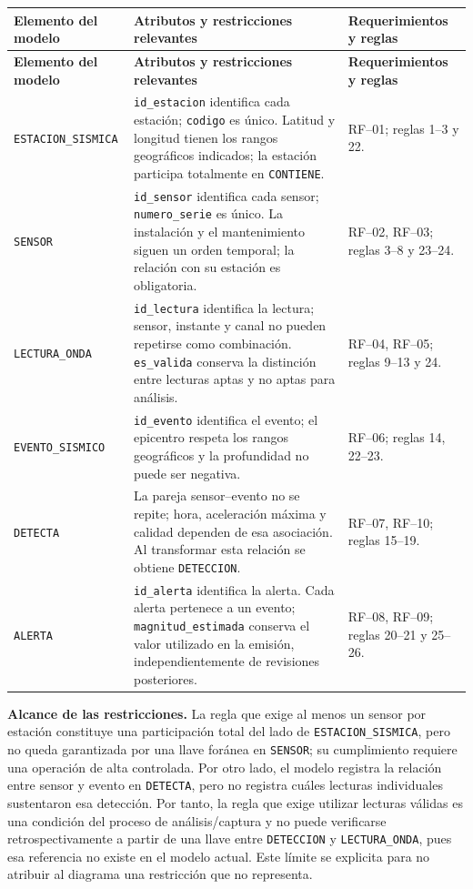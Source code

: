 \documentclass[12pt,a4paper]{article}
\begin{document}
{\small
\setlength{\tabcolsep}{4pt}
\renewcommand{\arraystretch}{1.15}
\begin{longtable}{>{\raggedright\arraybackslash}p{3.4cm}
                  >{\raggedright\arraybackslash}p{7.0cm}
                  >{\raggedright\arraybackslash}p{3.6cm}}
\toprule
\textbf{Elemento del modelo} & \textbf{Atributos y restricciones relevantes} & \textbf{Requerimientos y reglas} \\
\midrule
\endfirsthead
\toprule
\textbf{Elemento del modelo} & \textbf{Atributos y restricciones relevantes} & \textbf{Requerimientos y reglas} \\
\midrule
\endhead
\texttt{ESTACION\_SISMICA} &
\texttt{id\_estacion} identifica cada estación; \texttt{codigo} es único.
Latitud y longitud tienen los rangos geográficos indicados; la estación
participa totalmente en \texttt{CONTIENE}. &
RF--01; reglas 1--3 y 22. \\
\texttt{SENSOR} &
\texttt{id\_sensor} identifica cada sensor; \texttt{numero\_serie} es
único. La instalación y el mantenimiento siguen un orden temporal;
la relación con su estación es obligatoria. &
RF--02, RF--03; reglas 3--8 y 23--24. \\
\texttt{LECTURA\_ONDA} &
\texttt{id\_lectura} identifica la lectura; sensor, instante y canal
no pueden repetirse como combinación. \texttt{es\_valida} conserva
la distinción entre lecturas aptas y no aptas para análisis. &
RF--04, RF--05; reglas 9--13 y 24. \\
\texttt{EVENTO\_SISMICO} &
\texttt{id\_evento} identifica el evento; el epicentro respeta los
rangos geográficos y la profundidad no puede ser negativa. &
RF--06; reglas 14, 22--23. \\
\texttt{DETECTA} &
La pareja sensor--evento no se repite; hora, aceleración máxima y
calidad dependen de esa asociación. Al transformar esta relación
se obtiene \texttt{DETECCION}. &
RF--07, RF--10; reglas 15--19. \\
\texttt{ALERTA} &
\texttt{id\_alerta} identifica la alerta. Cada alerta pertenece a
un evento; \texttt{magnitud\_estimada} conserva el valor utilizado
en la emisión, independientemente de revisiones posteriores. &
RF--08, RF--09; reglas 20--21 y 25--26. \\
\bottomrule
\end{longtable}
}

\noindent
\textbf{Alcance de las restricciones.} La regla que exige al menos un sensor por estación constituye una participación total del lado de \texttt{ESTACION\_\allowbreak{}SISMICA}, pero no queda garantizada por una llave foránea en \texttt{SENSOR}; su cumplimiento requiere una operación de alta controlada. Por otro lado, el modelo registra la relación entre sensor y evento en \texttt{DETECTA}, pero no registra cuáles lecturas individuales sustentaron esa detección. Por tanto, la regla que exige utilizar lecturas válidas es una condición del proceso de análisis/captura y no puede verificarse retrospectivamente a partir de una llave entre \texttt{DETECCION} y \texttt{LECTURA\_\allowbreak{}ONDA}, pues esa referencia no existe en el modelo actual. Este límite se explicita para no atribuir al diagrama una restricción que no representa.
\end{document}
